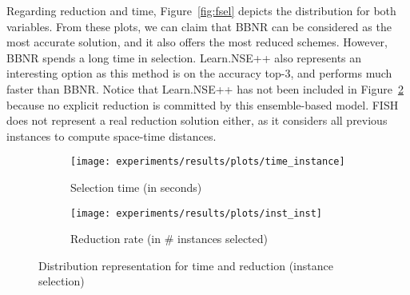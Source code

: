 \documentclass[preprint,12pt]{elsarticle}
\begin{document}
\begin{table}[!htp]
\renewcommand{\arraystretch}{1.3}
\centering
\scriptsize
\caption{Wilcoxon test results and average rankings of methods (Friedman Procedure \& Adjusted p-value with Holm's Test) for accuracy}
\label{tab:wilcoxon-isel}
\end{table}

Regarding reduction and time, Figure~\ref{fig:fsel} depicts the distribution for both variables. From these plots, we can claim that BBNR can be considered as the most accurate solution, and it also offers the most reduced schemes. However, BBNR spends a long time in selection. Learn.NSE++ also represents an interesting option as this method is on the accuracy top-3, and performs much faster than BBNR. Notice that Learn.NSE++ has not been included in Figure~\ref{fig:inst-isel} because no explicit reduction is committed by this ensemble-based model. FISH does not represent a real reduction solution either, as it considers all previous instances to compute space-time distances.

\begin{figure}
\begin{subfigure}{.5\textwidth}
  \centering
  \texttt{[image: experiments/results/plots/time\_instance]}
  \caption{Selection time (in seconds)}
  \label{fig:time-isel}
\end{subfigure}%
\begin{subfigure}{.5\textwidth}
  \centering
  \texttt{[image: experiments/results/plots/inst\_inst]}
  \caption{Reduction rate (in \# instances selected)}
  \label{fig:inst-isel}
\end{subfigure}
\caption{Distribution representation for time and reduction (instance selection)}
\label{fig:isel}
\end{figure}
\end{document}
